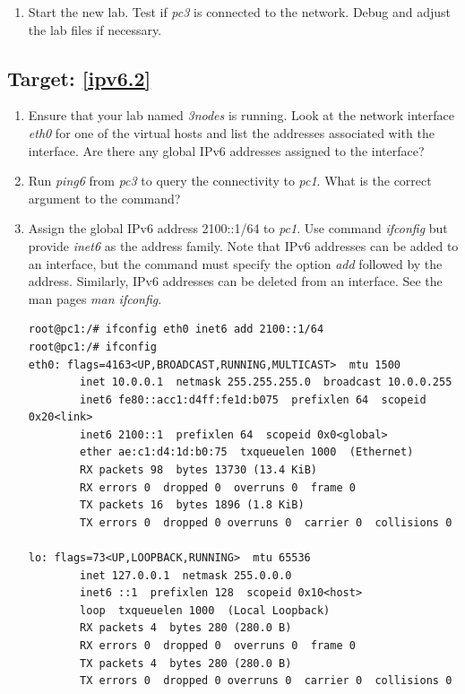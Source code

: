 \documentclass[12pt]{book}
\begin{document}
\begin{enumerate}[label=\arabic*.]
\begin{enumerate}[resume*]
\item Start the new lab. Test if \emph{pc3} is connected to the network. Debug and adjust the lab files if necessary.

\end{enumerate}


\subsection{Target: \ref{ipv6.2}}\label{ipv6.2.se}

\begin{enumerate}[resume*]
\item Ensure that your lab named \emph{3nodes} is running. Look at the network interface \emph{eth0} for one of the virtual hosts and list the addresses associated with the interface. Are there any global IPv6 addresses assigned to the interface?

\item Run \emph{ping6} from \emph{pc3} to query the connectivity to \emph{pc1}. What is the correct argument to the command?

\item Assign the global IPv6 address 2100::1/64 to \emph{pc1}. Use command \emph{ifconfig} but provide \emph{inet6} as the address family. Note that IPv6 addresses can be added to an interface, but the command must specify the option \emph{add} followed by the address. Similarly, IPv6 addresses can be deleted from an interface. See the man pages \emph{man ifconfig}.

  \begin{lstlisting}
root@pc1:/# ifconfig eth0 inet6 add 2100::1/64
root@pc1:/# ifconfig
eth0: flags=4163<UP,BROADCAST,RUNNING,MULTICAST>  mtu 1500
        inet 10.0.0.1  netmask 255.255.255.0  broadcast 10.0.0.255
        inet6 fe80::acc1:d4ff:fe1d:b075  prefixlen 64  scopeid 0x20<link>
        inet6 2100::1  prefixlen 64  scopeid 0x0<global>
        ether ae:c1:d4:1d:b0:75  txqueuelen 1000  (Ethernet)
        RX packets 98  bytes 13730 (13.4 KiB)
        RX errors 0  dropped 0  overruns 0  frame 0
        TX packets 16  bytes 1896 (1.8 KiB)
        TX errors 0  dropped 0 overruns 0  carrier 0  collisions 0

lo: flags=73<UP,LOOPBACK,RUNNING>  mtu 65536
        inet 127.0.0.1  netmask 255.0.0.0
        inet6 ::1  prefixlen 128  scopeid 0x10<host>
        loop  txqueuelen 1000  (Local Loopback)
        RX packets 4  bytes 280 (280.0 B)
        RX errors 0  dropped 0  overruns 0  frame 0
        TX packets 4  bytes 280 (280.0 B)
        TX errors 0  dropped 0 overruns 0  carrier 0  collisions 0
  \end{lstlisting}


\end{enumerate}
\end{enumerate}
\end{document}

